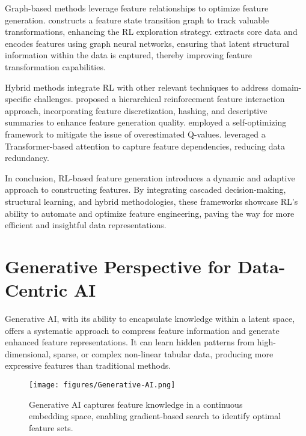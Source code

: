 Graph-based methods leverage feature relationships to optimize feature generation. \cite{huang2024enhancing} constructs a feature state transition graph to track valuable transformations, enhancing the RL exploration strategy. \cite{ying2024topology} extracts core data and encodes features using graph neural networks, ensuring that latent structural information within the data is captured, thereby improving feature transformation capabilities.

Hybrid methods integrate RL with other relevant techniques to address domain-specific challenges. \cite{ying2023self} proposed a hierarchical reinforcement feature interaction approach, incorporating feature discretization, hashing, and descriptive summaries to enhance feature generation quality. \cite{xiao2022self} employed a self-optimizing framework to mitigate the issue of overestimated Q-values. \cite{zhang2024tfwt} leveraged a Transformer-based attention to capture feature dependencies, reducing data redundancy.


In conclusion, RL-based feature generation introduces a dynamic and adaptive approach to constructing features. By integrating cascaded decision-making, structural learning, and hybrid methodologies, these frameworks showcase RL's ability to automate and optimize feature engineering, paving the way for more efficient and insightful data representations.





\section{Generative Perspective for Data-Centric AI}
Generative AI, with its ability to encapsulate knowledge within a latent space, offers a systematic approach to compress feature information and generate enhanced feature representations. It can learn hidden patterns from high-dimensional, sparse, or complex non-linear tabular data, producing more expressive features than traditional methods.

\begin{figure}[t]
    \centering
\texttt{[image: figures/Generative-AI.png]}
    \vspace{-0.3cm}
    \caption{Generative AI captures feature knowledge in a continuous embedding space, enabling gradient-based search to identify optimal feature sets.}
    \label{fig:generative AI}
    \vspace{-0.3cm}
\end{figure}


